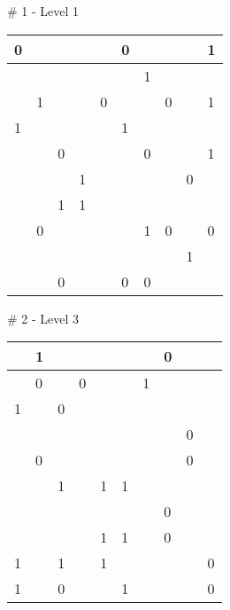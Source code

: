 \# 1 - Level 1 \newline
\begin{tabular}{|m{\collen}|m{\collen}|m{\collen}|m{\collen}|m{\collen}|m{\collen}|m{\collen}|m{\collen}|m{\collen}|m{\collen}|}
\hline
  0 &   &   &   &   & 0 &   &   &   & 1 \\
\hline
    &   &   &   &   &   & 1 &   &   &   \\
\hline
    & 1 &   &   & 0 &   &   & 0 &   & 1 \\
\hline
  1 &   &   &   &   & 1 &   &   &   &   \\
\hline
    &   & 0 &   &   &   & 0 &   &   & 1 \\
\hline
    &   &   & 1 &   &   &   &   & 0 &   \\
\hline
    &   & 1 & 1 &   &   &   &   &   &   \\
\hline
    & 0 &   &   &   &   & 1 & 0 &   & 0 \\
\hline
    &   &   &   &   &   &   &   & 1 &   \\
\hline
    &   & 0 &   &   & 0 & 0 &   &   &   \\
\hline
\end{tabular}


\medskip

\# 2 - Level 3 \newline
\begin{tabular}{|m{\collen}|m{\collen}|m{\collen}|m{\collen}|m{\collen}|m{\collen}|m{\collen}|m{\collen}|m{\collen}|m{\collen}|}
\hline
    & 1 &   &   &   &   &   & 0 &   &   \\
\hline
    & 0 &   & 0 &   &   & 1 &   &   &   \\
\hline
  1 &   & 0 &   &   &   &   &   &   &   \\
\hline
    &   &   &   &   &   &   &   & 0 &   \\
\hline
    & 0 &   &   &   &   &   &   & 0 &   \\
\hline
    &   & 1 &   & 1 & 1 &   &   &   &   \\
\hline
    &   &   &   &   &   &   & 0 &   &   \\
\hline
    &   &   &   & 1 & 1 &   & 0 &   &   \\
\hline
  1 &   & 1 &   & 1 &   &   &   &   & 0 \\
\hline
  1 &   & 0 &   &   & 1 &   &   &   & 0 \\
\hline
\end{tabular}


\medskip

